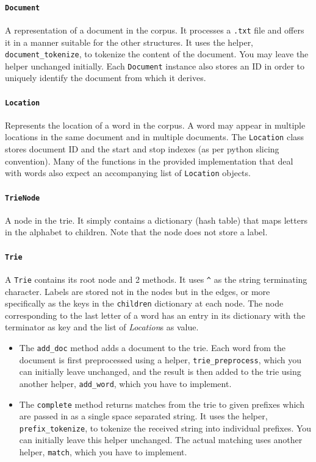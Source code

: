 \documentclass[addpoints]{exam}
\begin{document}
\paragraph{\texttt{Document}} A representation of a document in the corpus. It processes a \texttt{.txt} file and offers it in a manner suitable for the other structures. It uses the helper, \texttt{document\_tokenize}, to tokenize the content of the document. You may leave the helper unchanged initially. Each \texttt{Document} instance also stores an ID in order to uniquely identify the document from which it derives.

\paragraph{\texttt{Location}} Represents the location of a word in the corpus. A word may appear in multiple locations in the same document and in multiple documents. The \texttt{Location} class stores document ID and the start and stop indexes (as per python slicing convention). Many of the functions in the provided implementation that deal with words also expect an accompanying list of \texttt{Location} objects.

\paragraph{\texttt{TrieNode}} A node in the trie. It simply contains a dictionary (hash table) that maps letters in the alphabet to children. Note that the node does not store a label.

\paragraph{\texttt{Trie}} A \texttt{Trie} contains its root node and 2 methods. It uses \texttt{\^} as the string terminating character. Labels are stored not in the nodes but in the edges, or more specifically as the keys in the \texttt{children} dictionary at each node. The node corresponding to the last letter of a word has an entry in its dictionary with the terminator as key and the list of \textit{Location}s as value.
\begin{itemize}
\item The \texttt{add\_doc} method adds a document to the trie. Each word from the document is first preprocessed using a helper, \texttt{trie\_preprocess}, which you can initially leave unchanged, and the result is then added to the trie using another helper, \texttt{add\_word}, which you have to implement.
\item The \texttt{complete} method returns matches from the trie to given prefixes which are passed in as a single space separated string. It uses the helper, \texttt{prefix\_tokenize}, to tokenize the received string into individual prefixes. You can initially leave this helper unchanged. The actual matching uses another helper, \texttt{match}, which you have to implement.
\end{itemize}
\end{document}

